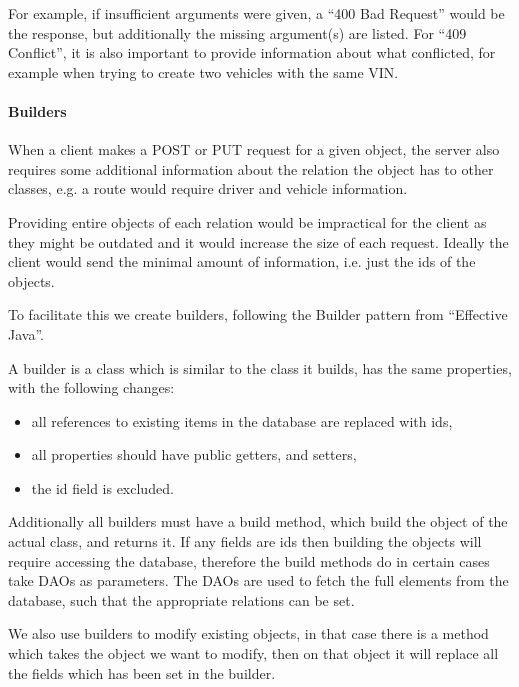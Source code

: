 For example, if insufficient arguments were given, a ``400 Bad Request'' would be the response,
but additionally the missing argument(s) are listed.
For ``409 Conflict'', it is also important to provide information about what conflicted,
for example when trying to create two vehicles with the same VIN.

\paragraph*{Builders}
When a client makes a POST or PUT request for a given object, 
the server also requires some additional information about the relation the object has to other classes, 
e.g. a route would require driver and vehicle information.

Providing entire objects of each relation would be impractical for the client as they might be outdated and it would increase the size of each request.
Ideally the client would send the minimal amount of information, i.e. just the ids of the objects.

To facilitate this we create builders, following the Builder pattern from ``Effective Java''\cite{Bloch:2008:EJ:1377533}. %

\bigskip
A builder is a class which is similar to the class it builds, has the same properties, with the following changes:
\begin{itemize}
    \item all references to existing items in the database are replaced with ids,
    \item all properties should have public getters, and setters,
    \item the id field is excluded.
\end{itemize}

Additionally all builders must have a build method, which build the object of the actual class, and returns it.
If any fields are ids then building the objects will require accessing the database,
therefore the build methods do in certain cases take \acp{DAO} as parameters.
The \acp{DAO} are used to fetch the full elements from the database, 
such that the appropriate relations can be set.

We also use builders to modify existing objects,
in that case there is a method which takes the object we want to modify,
then on that object it will replace all the fields which has been set in the builder.

